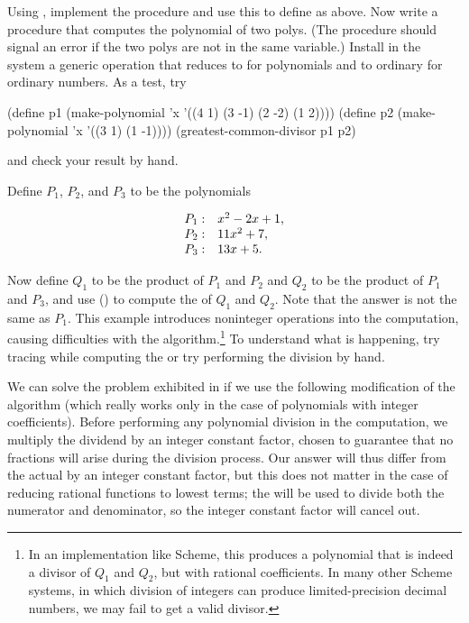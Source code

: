 \begin{exerciseGroup}
\label{Exercise 2.94}
 Using , implement
the procedure  and use this to define  as
above.  Now write a procedure  that computes the polynomial
 of two polys.  (The procedure should signal an error if the two
polys are not in the same variable.)  Install in the system a generic operation
 that reduces to  for polynomials
and to ordinary  for ordinary numbers.  As a test, try

\begin{codeBlock}
(define p1 (make-polynomial
            'x '((4 1) (3 -1) (2 -2) (1 2))))
(define p2 (make-polynomial 'x '((3 1) (1 -1))))
(greatest-common-divisor p1 p2)
\end{codeBlock}

\noindent
and check your result by hand.

\label{Exercise 2.95}
 Define \( P_1 \), \( P_2 \), and
\( P_3 \) to be the polynomials

$$
\begin{array}{l@{{}:}l}
	P_1 	& \quad x^2 - 2x + 1, \\
	P_2 	& \quad 11x^2 + 7, \\
	P_3 	& \quad 13x + 5.
\end{array}
$$

Now define \( Q_1 \) to be the product of \( P_1 \) and \( P_2 \) and \( Q_2 \) to be
the product of \( P_1 \) and \( P_3 \), and use 
() to compute the  of \( Q_1 \)
and \( Q_2 \).
Note that the answer is not the same as \( P_1 \).  This example introduces
noninteger operations into the computation, causing difficulties with the
 algorithm.\footnote{In an implementation like 
Scheme, this produces a polynomial that is indeed a divisor of \( Q_1 \) and
\( Q_2 \), but with rational coefficients.  In many other Scheme systems, in
which division of integers can produce limited-precision decimal numbers, we
may fail to get a valid divisor.}  To understand what is happening, try tracing
 while computing the  or try performing the
division by hand.
\end{exerciseGroup}

\noindent
We can solve the problem exhibited in  if we use the
following modification of the  algorithm (which really works only
in the case of polynomials with integer coefficients).  Before performing any
polynomial division in the  computation, we multiply the dividend
by an integer constant factor, chosen to guarantee that no fractions will arise
during the division process.  Our answer will thus differ from the actual
 by an integer constant factor, but this does not matter in the
case of reducing rational functions to lowest terms; the  will be
used to divide both the numerator and denominator, so the integer constant
factor will cancel out.

